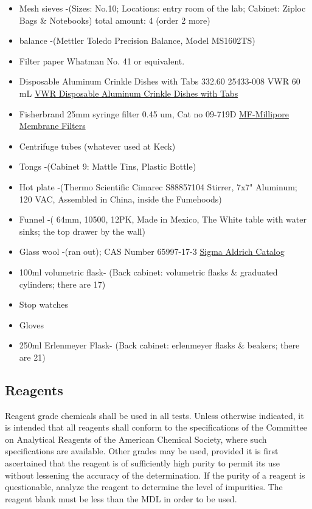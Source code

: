 \documentclass[12pt]{../SOP3_alpha}
\begin{document}
\begin{itemize}
  \item Mesh sieves -(Sizes: No.10; Locations: entry room of the lab; Cabinet: Ziploc Bags \& Notebooks) total amount: 4 (order 2 more) 
  \item balance -(Mettler Toledo Precision Balance, Model MS1602TS)
  \item Filter paper Whatman No. 41 or equivalent. 
  \item Disposable Aluminum Crinkle Dishes with Tabs 332.60 25433-008 VWR 60 mL \href{https://us.vwr.com/store/catalog/product.jsp?product_id=4622693}{VWR Disposable Aluminum Crinkle Dishes with Tabs}
  \item Fisherbrand 25mm syringe filter 0.45 um, Cat no 09-719D \href{https://www.emdmillipore.com/US/en/product/MF-Millipore%E2%84%A2-Membrane-Filters,MM_NF-C152}{MF-Millipore Membrane Filters}
  \item Centrifuge tubes (whatever used at Keck)
  \item Tongs -(Cabinet 9: Mattle Tins, Plastic Bottle)
  \item Hot plate -(Thermo Scientific Cimarec S88857104 Stirrer, 7x7" Aluminum; 120 VAC, Assembled in China, inside the Fumehoods)
  \item Funnel -( 64mm, 10500, 12PK, Made in Mexico, The White table with water sinks; the top drawer by the wall)
  \item Glass wool -(ran out); CAS Number 65997-17-3 \href{http://www.sigmaaldrich.com/catalog/product/sial/18421?lang=en&region=US}{Sigma Aldrich Catalog}
  \item 100ml volumetric flask- (Back cabinet: volumetric flasks \& graduated cylinders; there are 17)
  \item Stop watches 
  \item Gloves
  \item 250ml Erlenmeyer Flask- (Back cabinet: erlenmeyer flasks \& beakers; there are 21)
\end{itemize}

\subsection{Reagents}

\NP Reagent grade chemicals shall be used in all tests. Unless otherwise indicated, it is
intended that all reagents shall conform to the specifications of the Committee on Analytical Reagents of the American Chemical Society, where such specifications are available. Other grades may be used, provided it is first ascertained that the reagent is of sufficiently high purity to permit its use without lessening the accuracy of the determination. If the purity of a reagent is questionable, analyze the reagent to determine the level of impurities. The reagent blank must be less than the MDL in order to be used. 
\end{document}
